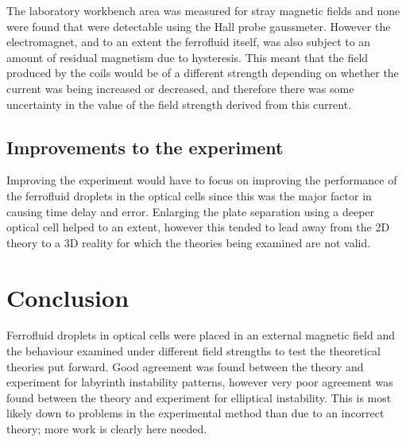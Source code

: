 \documentclass[12pt]{article}
\begin{document}
The laboratory workbench area was measured for stray magnetic fields and none were found that were detectable using the Hall probe gaussmeter. However the electromagnet, and to an extent the ferrofluid itself, was also subject to an amount of residual magnetism due to hysteresis. This meant that the field produced by the coils would be of a different strength depending on whether the current was being increased or decreased, and therefore there was some uncertainty in the value of the field strength derived from this current.

\subsection{Improvements to the experiment}
Improving the experiment would have to focus on improving the performance of the ferrofluid droplets in the optical cells since this was the major factor in causing time delay and error. Enlarging the plate separation using a deeper optical cell helped to an extent, however this tended to lead away from the 2D theory to a 3D reality for which the theories being examined are not valid.

\section{Conclusion}
Ferrofluid droplets in optical cells were placed in an external magnetic field and the behaviour examined under different field strengths to test the theoretical theories put forward. Good agreement was found between the theory and experiment for labyrinth instability patterns, however very poor agreement was found between the theory and experiment for elliptical instability. This is most likely down to problems in the experimental method than due to an incorrect theory; more work is clearly here needed.




\newpage
\end{document}
